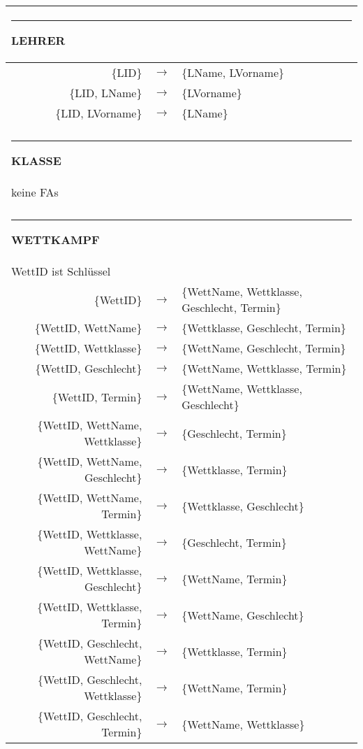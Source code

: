 \documentclass[pagesize,11pt,twoside]{scrartcl}
\def\TabKopf#1#2{\multicolumn{#2}{l}{\rule{1em}{0ex}\rule{0cm}{2.73ex}\textbf{#1}}\\\hline}
\begin{document}
\begin{tabular}{r>{$}c<{$}l}
\TabKopf{LEHRER}{3}
\{LID\} &\rightarrow & \{LName, LVorname\}\\

\{LID, LName\} &\rightarrow & \{LVorname\}\\
\{LID, LVorname\} &\rightarrow &\{LName\}\\&&\\\hline

\TabKopf{KLASSE}{3}
\multicolumn{3}{l}{keine FAs}\\&&\\\hline

\TabKopf{WETTKAMPF}{3}

\multicolumn{3}{l}{WettID ist Schlüssel}\\

\{WettID\} &\rightarrow & \{WettName, Wettklasse, Geschlecht, Termin\}\\

\{WettID, WettName\} &\rightarrow & \{Wettklasse, Geschlecht, Termin\}\\
\{WettID, Wettklasse\} &\rightarrow & \{WettName, Geschlecht, Termin\}\\
\{WettID, Geschlecht\} &\rightarrow & \{WettName, Wettklasse, Termin\}\\
\{WettID, Termin\} &\rightarrow & \{WettName, Wettklasse, Geschlecht\}\\

\{WettID, WettName, Wettklasse\} &\rightarrow & \{Geschlecht, Termin\}\\
\{WettID, WettName, Geschlecht\} &\rightarrow & \{Wettklasse, Termin\}\\
\{WettID, WettName, Termin\} &\rightarrow & \{Wettklasse, Geschlecht\}\\

\{WettID, Wettklasse, WettName\} &\rightarrow & \{Geschlecht, Termin\}\\
\{WettID, Wettklasse, Geschlecht\} &\rightarrow & \{WettName, Termin\}\\
\{WettID, Wettklasse, Termin\} &\rightarrow & \{WettName, Geschlecht\}\\

\{WettID, Geschlecht, WettName\} &\rightarrow & \{Wettklasse, Termin\}\\
\{WettID, Geschlecht, Wettklasse\} &\rightarrow & \{WettName, Termin\}\\
\{WettID, Geschlecht, Termin\} &\rightarrow & \{WettName, Wettklasse\}\\


\end{tabular}
\end{document}
